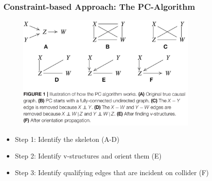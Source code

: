 \documentclass[10pt,xcolor={usenames,dvipsnames,table}]{beamer}
\begin{document}
\begin{frame}
    \frametitle{Constraint-based Approach: The PC-Algorithm}
    \begin{figure}
        \centering
        \includegraphics[width=0.8\textwidth]{figures/pc.png}
        \caption*{\citep{glymour2019review}}
    \end{figure}
    \begin{itemize}
        \item Step 1: Identify the skeleton (A-D)
        \item Step 2: Identify v-structures and orient them (E)
        \item Step 3: Identify qualifying edges that are incident on collider (F)
    \end{itemize}
\end{frame}
\end{document}
